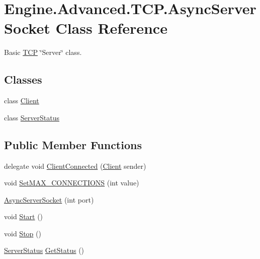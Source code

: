\hypertarget{class_engine_1_1_advanced_1_1_t_c_p_1_1_async_server_socket}{}\section{Engine.\+Advanced.\+T\+C\+P.\+Async\+Server\+Socket Class Reference}
\label{class_engine_1_1_advanced_1_1_t_c_p_1_1_async_server_socket}


Basic \mbox{\hyperlink{namespace_engine_1_1_advanced_1_1_t_c_p}{T\+CP}} \char`\"{}\+Server\char`\"{} class.  


\subsection*{Classes}
\begin{DoxyCompactItemize}
\item 
class \mbox{\hyperlink{class_engine_1_1_advanced_1_1_t_c_p_1_1_async_server_socket_1_1_client}{Client}}
\item 
class \mbox{\hyperlink{class_engine_1_1_advanced_1_1_t_c_p_1_1_async_server_socket_1_1_server_status}{Server\+Status}}
\end{DoxyCompactItemize}
\subsection*{Public Member Functions}
\begin{DoxyCompactItemize}
\item 
delegate void \mbox{\hyperlink{class_engine_1_1_advanced_1_1_t_c_p_1_1_async_server_socket_a5ef0e8ba1403714516d655edff0c24d6}{Client\+Connected}} (\mbox{\hyperlink{class_engine_1_1_advanced_1_1_t_c_p_1_1_async_server_socket_1_1_client}{Client}} sender)
\item 
void \mbox{\hyperlink{class_engine_1_1_advanced_1_1_t_c_p_1_1_async_server_socket_a8bb6a6abd6f22fb18f05e9c182ad1431}{Set\+M\+A\+X\+\_\+\+C\+O\+N\+N\+E\+C\+T\+I\+O\+NS}} (int value)
\item 
\mbox{\hyperlink{class_engine_1_1_advanced_1_1_t_c_p_1_1_async_server_socket_a9fe683c88657977ed3f83e97615fd4fe}{Async\+Server\+Socket}} (int port)
\item 
void \mbox{\hyperlink{class_engine_1_1_advanced_1_1_t_c_p_1_1_async_server_socket_a958fcabdd5b6883034f0e9ac513fba36}{Start}} ()
\item 
void \mbox{\hyperlink{class_engine_1_1_advanced_1_1_t_c_p_1_1_async_server_socket_acbb4be50434a8cad095b091d821fc451}{Stop}} ()
\item 
\mbox{\hyperlink{class_engine_1_1_advanced_1_1_t_c_p_1_1_async_server_socket_1_1_server_status}{Server\+Status}} \mbox{\hyperlink{class_engine_1_1_advanced_1_1_t_c_p_1_1_async_server_socket_a0000666d419ca4cbe5b1b16073f66d25}{Get\+Status}} ()
\end{DoxyCompactItemize}
